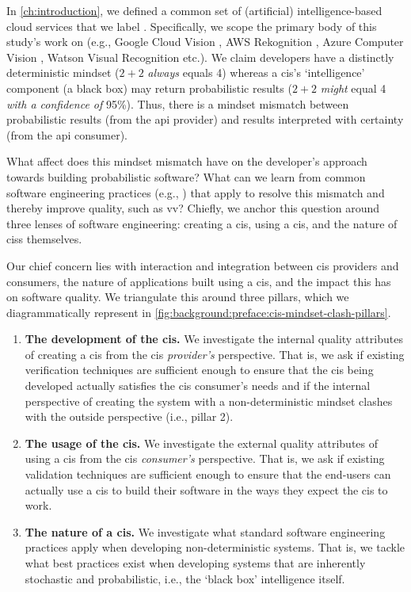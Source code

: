 \label{sec:background:preface}

In \cref{ch:introduction}, we defined a common set of (artificial) intelligence-based cloud services that we label . Specifically, we scope the primary body of this study's work on  (e.g., Google Cloud Vision \citep{GoogleCloud:Home}, AWS Rekognition \citep{AWS:Home}, Azure Computer Vision \citep{Azure:Home}, Watson Visual Recognition \citep{IBM:Home} etc.). We claim developers have a distinctly deterministic mindset ($2+2$ \textit{always}  equals 4) whereas a \gls{cis}'s `intelligence' component (a black box) may return probabilistic results ($2+2$ \textit{might} equal 4 \textit{with a confidence of} 95\%). Thus, there is a mindset mismatch between probabilistic results (from the \gls{api} provider) and results interpreted with certainty (from the \gls{api} consumer).

What affect does this mindset mismatch have on the developer's approach towards building probabilistic software? What can we learn from common software engineering practices (e.g., \citep{Pressman:2005vf,Sommerville:2011uc}) that apply to resolve this mismatch and thereby improve quality, such as \gls{vv}? Chiefly, we anchor this question around three lenses of software engineering: creating a \gls{cis}, using a \gls{cis}, and the nature of \glspl{cis} themselves.

Our chief concern lies with interaction and integration between \gls{cis} providers and consumers, the nature of applications built using a \gls{cis}, and the impact this has on software quality. We triangulate this around three pillars, which we diagrammatically represent in \cref{fig:background:preface:cis-mindset-clash-pillars}.
 
\begin{enumerate}[label=\textbf{(\arabic*})]
\item \textbf{The development of the \gls{cis}.} We investigate the internal quality attributes of creating a \gls{cis} from the \gls{cis} \textit{provider's} perspective. That is, we ask if existing verification techniques are sufficient enough to ensure that the \gls{cis} being developed actually satisfies the \gls{cis} consumer's needs and if the internal perspective of creating the system with a non-deterministic mindset clashes with the outside perspective (i.e., pillar 2).
\item \textbf{The usage of the \gls{cis}.} We investigate the external quality attributes of using a \gls{cis} from the \gls{cis} \textit{consumer's} perspective. That is, we ask if existing validation techniques are sufficient enough to ensure that the end-users can actually use a \gls{cis} to build their software in the ways they expect the \gls{cis} to work.
\item \textbf{The nature of a \gls{cis}.} We investigate what standard software engineering practices apply when developing non-deterministic systems. That is, we tackle what best practices exist when developing systems that are inherently stochastic and probabilistic, i.e., the `black box' intelligence itself.
\end{enumerate}

